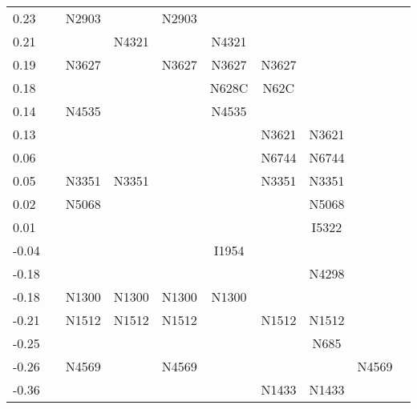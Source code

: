 \begin{table*}
\begin{center}
\begin{tabular}{lccccccccc}
0.23 & & N2903 & & N2903 & & & & \\
0.21 & & & N4321 & & N4321 & & & \\
0.19 & & N3627 & & N3627 & N3627 & N3627 & & \\
0.18 & & & & & N628C & N62C & & \\
0.14 & & N4535 & & & N4535 & & & \\
0.13 & & & & & & N3621 & N3621 & \\
0.06 & &   & & & & N6744 & N6744 & \\
0.05 & & N3351 & N3351 & & & N3351 & N3351 & \\
0.02 & & N5068 & & & & & N5068 & \\
0.01 & & & & & & & I5322 & \\
-0.04 & &  & & & I1954 & & & \\
-0.18 & & & & & & & N4298 & \\
-0.18 & & N1300 & N1300 & N1300 &  N1300 & & & \\
-0.21 & & N1512 & N1512 & N1512 & & N1512 & N1512& \\
-0.25 & &  & & & & & N685 & \\
-0.26 & & N4569 & & N4569 & & & & N4569\\
-0.36 & &  & & & & N1433 & N1433 & \\


\end{tabular}
\end{center}
\end{table*}
